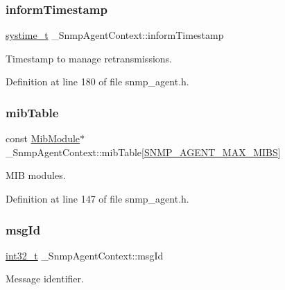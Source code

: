 \subsubsection{\texorpdfstring{inform\+Timestamp}{informTimestamp}}
{\footnotesize\ttfamily \hyperlink{compiler__port_8h_ae3e32a98d431a02106616da3071832dd}{systime\+\_\+t} \+\_\+\+Snmp\+Agent\+Context\+::inform\+Timestamp}



Timestamp to manage retransmissions. 



Definition at line 180 of file snmp\+\_\+agent.\+h.

\mbox{\label{struct__SnmpAgentContext_acd71162ff8fc9d9ac890f6b425d48a88}} 
\subsubsection{\texorpdfstring{mib\+Table}{mibTable}}
{\footnotesize\ttfamily const \hyperlink{structMibModule}{Mib\+Module}$\ast$ \+\_\+\+Snmp\+Agent\+Context\+::mib\+Table\mbox{[}\hyperlink{snmp__agent_8h_a5d367250fd498e757229b7ab62c3121a}{S\+N\+M\+P\+\_\+\+A\+G\+E\+N\+T\+\_\+\+M\+A\+X\+\_\+\+M\+I\+BS}\mbox{]}}



M\+IB modules. 



Definition at line 147 of file snmp\+\_\+agent.\+h.

\mbox{\label{struct__SnmpAgentContext_aef6911d86d45747ec920d865078dbad9}} 
\subsubsection{\texorpdfstring{msg\+Id}{msgId}}
{\footnotesize\ttfamily \hyperlink{stdint_8h_ab1967d8591af1a4e48c37fd2b0f184d0}{int32\+\_\+t} \+\_\+\+Snmp\+Agent\+Context\+::msg\+Id}



Message identifier. 



